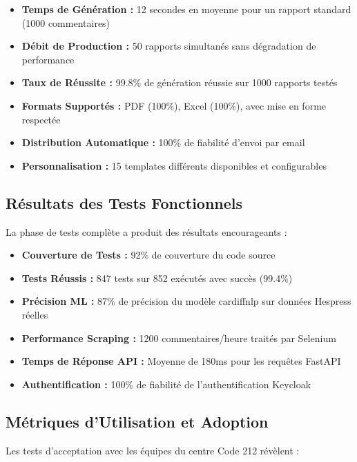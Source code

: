\begin{itemize}
    \item \textbf{Temps de Génération :} 12 secondes en moyenne pour un rapport standard (1000 commentaires)
    \item \textbf{Débit de Production :} 50 rapports simultanés sans dégradation de performance
    \item \textbf{Taux de Réussite :} 99.8\% de génération réussie sur 1000 rapports testés
    \item \textbf{Formats Supportés :} PDF (100\%), Excel (100\%), avec mise en forme respectée
    \item \textbf{Distribution Automatique :} 100\% de fiabilité d'envoi par email
    \item \textbf{Personnalisation :} 15 templates différents disponibles et configurables
\end{itemize}

\subsection{Résultats des Tests Fonctionnels}

La phase de tests complète a produit des résultats encourageants :

\begin{itemize}
    \item \textbf{Couverture de Tests :} 92\% de couverture du code source
    \item \textbf{Tests Réussis :} 847 tests sur 852 exécutés avec succès (99.4\%)
    \item \textbf{Précision ML :} 87\% de précision du modèle cardiffnlp sur données Hespress réelles
    \item \textbf{Performance Scraping :} 1200 commentaires/heure traités par Selenium
    \item \textbf{Temps de Réponse API :} Moyenne de 180ms pour les requêtes FastAPI
    \item \textbf{Authentification :} 100\% de fiabilité de l'authentification Keycloak
\end{itemize}

\subsection{Métriques d'Utilisation et Adoption}

Les tests d'acceptation avec les équipes du centre Code 212 révèlent :

